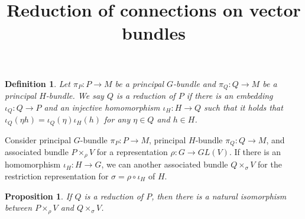 \documentclass[b5paper]{article}
\title{Reduction of connections on vector bundles}
\date{}
\newtheorem{proposition}{Proposition}
\newtheorem{definition}{Definition}
\begin{document}
  \maketitle


  \begin{definition}
    Let $\pi_P: P \to M$ be a principal $G$-bundle and
    $\pi_Q: Q \to M$ be a principal $H$-bundle.
    We say $Q$ is a {\rm reduction} of $P$ if there is an embedding $\iota_Q: Q \to P$ and
    an injective homomorphism $\iota_H: H \to Q$ such that it holds that
    $\iota_Q(\eta h) = \iota_Q(\eta) \iota_H(h)$ for any $\eta \in Q$ and $h \in H$.
  \end{definition}


  Consider principal $G$-bundle $\pi_P: P \to M$, principal $H$-bundle $\pi_Q: Q \to M$,
  and associated bundle $P \times_\rho V$ for
  a representation $\rho: G \to GL(V)$.
  If there is an homomorphism $\iota_H: H \to G$,
  we can another associated bundle $Q \times_\sigma V$ for
  the restriction representation for $\sigma = \rho \circ \iota_H$ of $H$.


  \begin{proposition}
    If $Q$ is a reduction of $P$, then there is a natural isomorphism between
    $P \times_\rho V$ and $Q \times_\sigma V$.
  \end{proposition}
\end{document}
